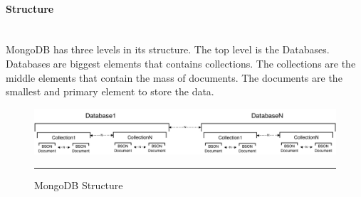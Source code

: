 \documentclass[12pt, a4paper,twoside]{tesi_upf}
\begin{document}
            \paragraph{Structure}\\
            
            MongoDB has three levels in its structure. The top level is the Databases. Databases are biggest elements that contains collections. The collections are the middle elements that contain the mass of documents. The documents are the smallest and primary element to store the data.
            
        \begin{figure}[htbp]
          \centering
              \includegraphics[scale=0.35,angle=0]{./figures/mstr.png}
              \rule{32em}{0.5pt}
            \caption[MongoDB Structure]{MongoDB Structure}
            \label{fig:mstruc}
        \end{figure}
            
\end{document}
